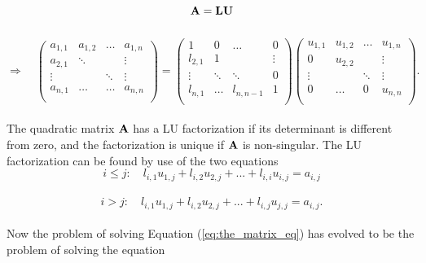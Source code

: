 \documentclass[12pt]{article}
\begin{document}
\begin{flushleft}
$$\bf A = \bf LU$$\\
$$\Rightarrow \quad
    \left(\begin{array}{cccc}
    a_{1,1} & a_{1,2} & \dots & a_{1,n} \\
    a_{2,1} & \ddots &  &\vdots \\
    \vdots &  & \ddots & \vdots \\
    a_{n,1} & \dots & \dots & a_{n,n}\\
    \end{array} \right) =
    \left(\begin{array}{cccc}
    1 & 0 & \dots & 0 \\
    l_{2,1} & 1 &  &\vdots \\
    \vdots & \ddots & \ddots & 0 \\
    l_{n,1} & \dots & l_{n,n-1} & 1\\
    \end{array} \right) 
    \left(\begin{array}{cccc}
    u_{1,1} & u_{1,2} & \dots & u_{1,n} \\
    0 & u_{2,2} &  &\vdots \\
    \vdots & & \ddots & \vdots \\
    0 & \dots & 0 & u_{n,n}\\
    \end{array} \right). 
$$\\ 
\vspace{5mm}
The quadratic matrix $\bf A$ has a LU factorization if its determinant is different from zero, and the factorization is unique if $\bf A$ is non-singular. The LU factorization can be found by use of the two equations\\

$$i\leq j:\quad l_{i,1}u_{1,j} + l_{i,2}u_{2,j}+...+l_{i,i}u_{i,j} = a_{i,j}$$\\
$$i>j:\quad l_{i,1}u_{1,j} + l_{i,2}u_{2,j}+...+l_{i,j}u_{j,j} = a_{i,j}.$$\\
\newpage
Now the problem of solving Equation (\ref{eq:the_matrix_eq}) has evolved to be the problem of solving the equation\\


\end{flushleft}
\end{document}

